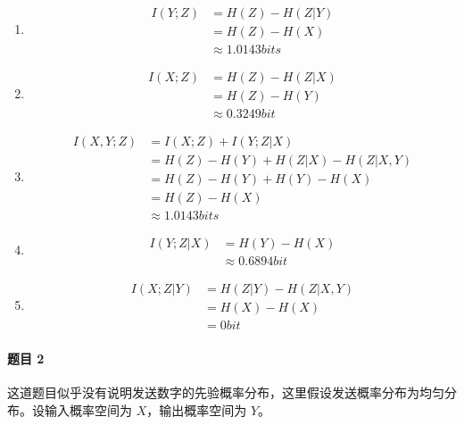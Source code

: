 \documentclass{ctexart}
\begin{document}
\begin{enumerate}
    \item\begin{align}
        I(Y; Z) &= H(Z) - H(Z|Y) \\
        &= H(Z) - H(X) \\
        &\approx 1.0143 bits
    \end{align}
    \item\begin{align}
        I(X; Z) &= H(Z) - H(Z|X) \\
        &= H(Z) - H(Y) \\
        &\approx 0.3249 bit
    \end{align}
    \item\begin{align}
        I(X, Y; Z) &= I(X; Z) + I(Y; Z|X) \\
        &= H(Z) - H(Y) + H(Z|X) - H(Z|X, Y) \\
        &= H(Z) - H(Y) + H(Y) - H(X) \\
        &= H(Z) - H(X) \\
        &\approx 1.0143 bits
    \end{align}
    \item\begin{align}
        I(Y; Z|X) &= H(Y) - H(X) \\
        &\approx 0.6894 bit
    \end{align}
    \item\begin{align}
        I(X; Z|Y) &= H(Z|Y) - H(Z|X, Y) \\
        &= H(X) - H(X) \\
        &= 0 bit
    \end{align}
\end{enumerate}

\paragraph{题目 2}

这道题目似乎没有说明发送数字的先验概率分布，这里假设发送概率分布为均匀分布。设输入概率空间为 $X$，输出概率空间为 $Y$。
\end{document}
